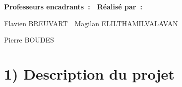 \documentclass[12pt]{article}
\begin{document}
\vspace{\baselineskip}

\vspace{\baselineskip}

\vspace{\baselineskip}

\vspace{\baselineskip}

\vspace{\baselineskip}

\vspace{\baselineskip}
\textbf{Professeurs encadrants :\tab \tab \tab \tab }\tab \ \  \textbf{Réalisé par : }\par

Flavien BREUVART\tab \tab \tab \tab \tab  \ \  Magilan ELILTHAMILVALAVAN\par

Pierre BOUDES\tab \tab \tab \tab \tab \tab \ \  \par
\vspace{\baselineskip}
\vspace{\baselineskip}
\vspace{\baselineskip}
\vspace{\baselineskip}
\vspace{\baselineskip}
\vspace{\baselineskip}
\vspace{\baselineskip}
\vspace{\baselineskip}
\vspace{\baselineskip}
\vspace{\baselineskip}
\vspace{\baselineskip}
\vspace{\baselineskip}
\vspace{\baselineskip}
\vspace{\baselineskip}
\vspace{\baselineskip}
\vspace{\baselineskip}
\vspace{\baselineskip}
\vspace{\baselineskip}
\vspace{\baselineskip}
\vspace{\baselineskip}
\vspace{\baselineskip}
\vspace{\baselineskip}
\vspace{\baselineskip}

\section*{1) Description du projet}
\end{document}
